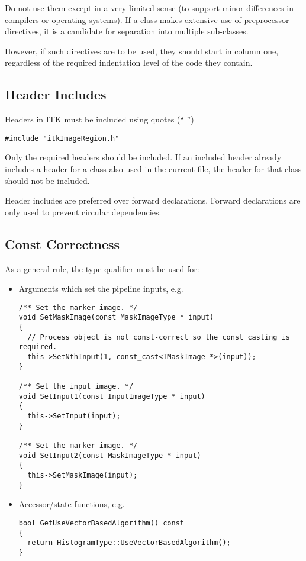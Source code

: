 Do not use them except in a very limited sense (to support minor differences
in compilers or operating systems). If a class makes extensive use of
preprocessor directives, it is a candidate for separation into multiple
sub-classes.

However, if such directives are to be used, they should start in column one,
regardless of the required indentation level of the code they contain.


\subsection{Header Includes}
\label{subsec:HeaderIncludes}

Headers in ITK must be included using quotes (`` '')

\small
\begin{verbatim}
#include "itkImageRegion.h"
\end{verbatim}
\normalsize

Only the required headers should be included. If an included header already
includes a header for a class also used in the current file, the header for that
class should not be included.

Header includes are preferred over forward declarations. Forward declarations
are only used to prevent circular dependencies.


\subsection{Const Correctness}
\label{subsec:ConstCorrectness}

As a general rule, the  type qualifier must be used for:
\begin{itemize}
\item Arguments which set the pipeline inputs, e.g.

\small
\begin{verbatim}
/** Set the marker image. */
void SetMaskImage(const MaskImageType * input)
{
  // Process object is not const-correct so the const casting is required.
  this->SetNthInput(1, const_cast<TMaskImage *>(input));
}

/** Set the input image. */
void SetInput1(const InputImageType * input)
{
  this->SetInput(input);
}

/** Set the marker image. */
void SetInput2(const MaskImageType * input)
{
  this->SetMaskImage(input);
}
\end{verbatim}
\normalsize

\item Accessor/state functions, e.g.

\small
\begin{verbatim}
bool GetUseVectorBasedAlgorithm() const
{
  return HistogramType::UseVectorBasedAlgorithm();
}
\end{verbatim}
\normalsize

\end{itemize}


